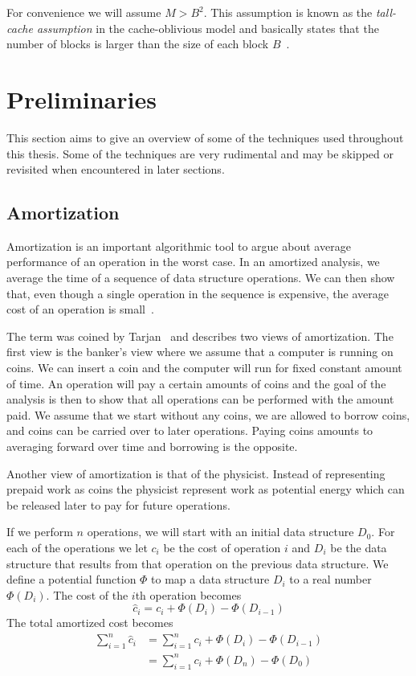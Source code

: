 \documentclass[twoside,11pt,openright]{report}
\begin{document}
For convenience we will assume $M > B^2$. This assumption is known as the \textit{tall-cache assumption} in the cache-oblivious model and basically states that the number of blocks  is larger than the size of each block $B$~\cite{Prokop99cache-obliviousalgorithms}.

\chapter{Preliminaries}
\label{chp:prelims}
This section aims to give an overview of some of the techniques used throughout this thesis. Some of the techniques are very rudimental and may be skipped or revisited when encountered in later sections.

\section{Amortization}
Amortization is an important algorithmic tool to argue about average performance of an operation in the worst case.
In an amortized analysis, we average the time of a sequence of data structure operations. We can then show that, even though a single operation in the sequence is expensive, the average cost of an operation is small~\cite[p.~451-452]{clrs}.

The term was coined by Tarjan~\cite{Tarjan85} and describes two views of amortization. The first view is the banker's view where we assume that a computer is running on coins. We can insert a coin and the computer will run for fixed constant amount of time. An operation will pay a certain amounts of coins and the goal of the analysis is then to show that all operations can be performed with the amount paid. We assume that we start without any coins, we are allowed to borrow coins, and coins can be carried over to later operations. Paying coins amounts to averaging forward over time and borrowing is the opposite.

Another view of amortization is that of the physicist. Instead of representing prepaid work as coins the physicist represent work as potential energy which can be released later to pay for future operations.

If we perform $n$ operations, we will start with an initial data structure $D_0$. For each of the operations we let $c_i$ be the cost of operation $i$ and $D_i$ be the data structure that results from that operation on the previous data structure. We define a potential function $\Phi$ to map a data structure $D_i$ to a real number $\Phi(D_i)$. The cost of the $i$th operation becomes
$$\hat{c}_i = c_i + \Phi(D_i) - \Phi(D_{i-1})$$
The total amortized cost becomes
\begin{align*}
\sum_{i=1}^n \hat{c}_i &= \sum_{i=1}^n c_i + \Phi(D_i) - \Phi(D_{i-1}) \\
&= \sum_{i=1}^n c_i + \Phi(D_n) - \Phi(D_{0})
\end{align*}
\end{document}
